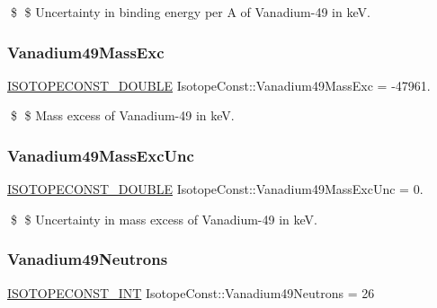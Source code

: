\$ \$ Uncertainty in binding energy per A of Vanadium-\/49 in keV. \mbox{\label{group___isotope_const-_vanadium-_v49_ga242c31b22bb5d7e1f2f1d38751bd5b7e}} 
\subsubsection{\texorpdfstring{Vanadium49\+Mass\+Exc}{Vanadium49MassExc}}
{\footnotesize\ttfamily \mbox{\hyperlink{group___isotope_const-_macros_ga8f45a7272ce02c0b4c65c44636ed719a}{I\+S\+O\+T\+O\+P\+E\+C\+O\+N\+S\+T\+\_\+\+D\+O\+U\+B\+LE}} Isotope\+Const\+::\+Vanadium49\+Mass\+Exc = -\/47961.}

\$ \$ Mass excess of Vanadium-\/49 in keV. \mbox{\label{group___isotope_const-_vanadium-_v49_ga390a0c0b646d8bd334e79a2df9fb56aa}} 
\subsubsection{\texorpdfstring{Vanadium49\+Mass\+Exc\+Unc}{Vanadium49MassExcUnc}}
{\footnotesize\ttfamily \mbox{\hyperlink{group___isotope_const-_macros_ga8f45a7272ce02c0b4c65c44636ed719a}{I\+S\+O\+T\+O\+P\+E\+C\+O\+N\+S\+T\+\_\+\+D\+O\+U\+B\+LE}} Isotope\+Const\+::\+Vanadium49\+Mass\+Exc\+Unc = 0.}

\$ \$ Uncertainty in mass excess of Vanadium-\/49 in keV. \mbox{\label{group___isotope_const-_vanadium-_v49_ga602cde2998e51e248956db3f3b8d4b7d}} 
\subsubsection{\texorpdfstring{Vanadium49\+Neutrons}{Vanadium49Neutrons}}
{\footnotesize\ttfamily \mbox{\hyperlink{group___isotope_const-_macros_ga5f18360b3e99483a35c32d789e62621c}{I\+S\+O\+T\+O\+P\+E\+C\+O\+N\+S\+T\+\_\+\+I\+NT}} Isotope\+Const\+::\+Vanadium49\+Neutrons = 26}

